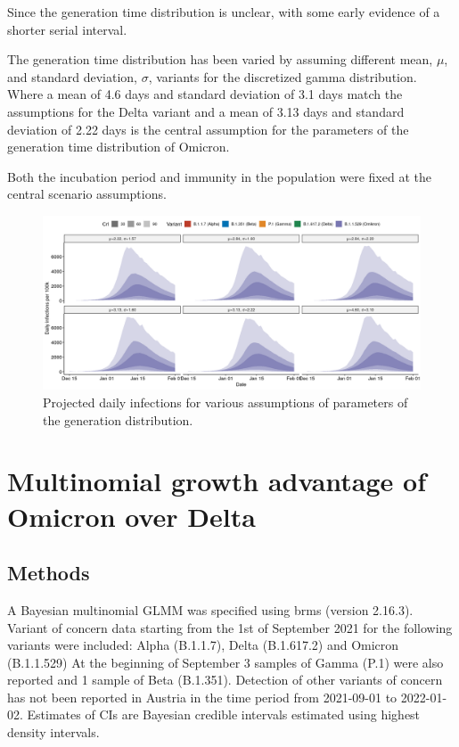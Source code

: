 \documentclass[
]{article}
\begin{document}
Since the generation time distribution is unclear, with some early evidence of a shorter serial interval. \autocite{SerialIntervalBasic}

The generation time distribution has been varied by assuming different mean, \(\mu\),
and standard deviation, \(\sigma\), variants for the discretized gamma distribution.
Where a mean of 4.6 days and standard deviation of 3.1 days match the assumptions for the Delta variant
and a mean of 3.13 days and standard deviation of 2.22 days is the central
assumption for the parameters of the generation time distribution of Omicron.

Both the incubation period and immunity in the population were fixed at the
central scenario assumptions.

\begin{figure}
\includegraphics[width=1\linewidth]{omicron_austria_files/figure-latex/generation-time-scenarios-1} \caption{Projected daily infections for various assumptions of parameters of the generation distribution.}\label{fig:generation-time-scenarios}
\end{figure}

\hypertarget{multinomial-growth-advantage-of-omicron-over-delta}{%
\section{Multinomial growth advantage of Omicron over Delta}\label{multinomial-growth-advantage-of-omicron-over-delta}}

\hypertarget{methods-1}{%
\subsection{Methods}\label{methods-1}}

A Bayesian multinomial GLMM was specified using brms (version 2.16.3). Variant of concern data starting from the 1st of September 2021 for the following variants were included: Alpha (B.1.1.7), Delta (B.1.617.2) and Omicron (B.1.1.529) At the beginning of September 3 samples of Gamma (P.1) were also reported and 1 sample of Beta (B.1.351). Detection of other variants of concern has not been reported in Austria in the time period from 2021-09-01 to 2022-01-02. Estimates of CIs are Bayesian credible intervals estimated using highest density intervals.
\end{document}
